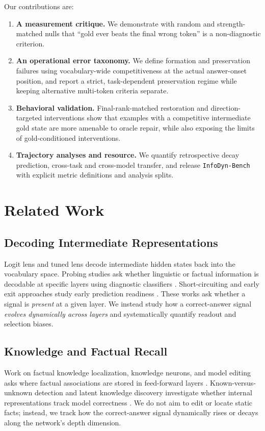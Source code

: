\documentclass{article} %
\begin{document}
Our contributions are:
\begin{enumerate}
    \item \textbf{A measurement critique.} We demonstrate with random and strength-matched nulls that ``gold ever beats the final wrong token'' is a non-diagnostic criterion.
    \item \textbf{An operational error taxonomy.} We define formation and preservation failures using vocabulary-wide competitiveness at the actual answer-onset position, and report a strict, task-dependent preservation regime while keeping alternative multi-token criteria separate.
    \item \textbf{Behavioral validation.} Final-rank-matched restoration and direction-targeted interventions show that examples with a competitive intermediate gold state are more amenable to oracle repair, while also exposing the limits of gold-conditioned interventions.
    \item \textbf{Trajectory analyses and resource.} We quantify retrospective decay prediction, cross-task and cross-model transfer, and release \texttt{InfoDyn-Bench} with explicit metric definitions and analysis splits.
\end{enumerate}

\section{Related Work}

\subsection{Decoding Intermediate Representations}
Logit lens \citep{nostalgebraist2020logitlens} and tuned lens \citep{belrose2023tunedlens} decode intermediate hidden states back into the vocabulary space. Probing studies ask whether linguistic or factual information is decodable at specific layers using diagnostic classifiers \citep{alain2016understanding, tenney2019bert, hewitt2019structural, belinkov2022probing}. Short-circuiting and early exit approaches study early prediction readiness \citep{schuster2022confident, din2023jump}. These works ask whether a signal is \emph{present} at a given layer. We instead study how a correct-answer signal \emph{evolves dynamically across layers} and systematically quantify readout and selection biases.

\subsection{Knowledge and Factual Recall}
Work on factual knowledge localization, knowledge neurons, and model editing asks where factual associations are stored in feed-forward layers \citep{geva2021transformer, dai2022knowledge, meng2022rome, meng2023memit, geva2023dissecting}. Known-versus-unknown detection and latent knowledge discovery investigate whether internal representations track model correctness \citep{kadavath2022language, burns2022discovering, azaria2023internal, yin2023do, li2024inference}. We do not aim to edit or locate static facts; instead, we track how the correct-answer signal dynamically rises or decays along the network's depth dimension.
\end{document}
